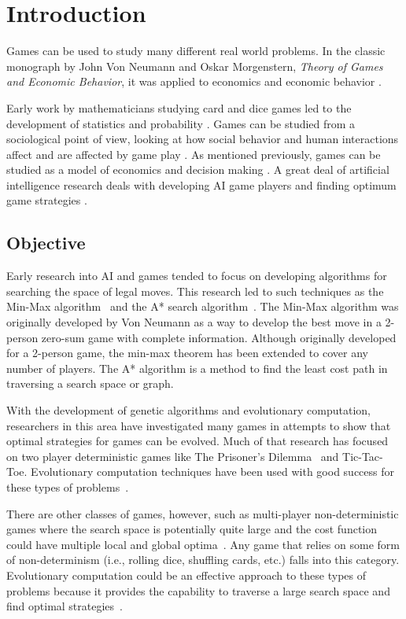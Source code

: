 \clearpage
\chapter{Introduction}\label{chap:intro}
Games can be used to study many different real world problems. In the
classic monograph by John Von Neumann and Oskar Morgenstern, \emph{Theory of
Games and Economic Behavior}, it was applied to economics and economic behavior
\cite{neumann1944theory}.

Early work by mathematicians studying card and dice games led to the development
of statistics and probability \cite{hald1990history,rudas2008handbook}. Games
can be studied from a sociological point of view, looking at how social behavior
and human interactions affect and are affected by game play
\cite{fararo1992meaning}. As mentioned previously, games can be studied as a
model of economics and decision making \cite{neumann1944theory}. A great deal of
artificial intelligence research deals with developing AI game players and
finding optimum game strategies \cite{russell2010artificial}.

\section{Objective}

Early research into AI and games tended to focus on developing algorithms for
searching the space of legal moves. This research led to such techniques as the
Min-Max algorithm~\cite{neumann1944theory} and the A* search
algorithm~\cite{Hart_Nilsson_Raphael_1968,Hart:1972:LFB:1056777.1056779}. The
Min-Max algorithm was originally developed by Von Neumann as a way to develop
the best move in a 2-person zero-sum game with complete information. Although
originally developed for a 2-person game, the min-max theorem has been extended
to cover any number of players. The A* algorithm is a method to find the least
cost path in traversing a search space or graph.

With the development of genetic algorithms and evolutionary computation,
re\-search\-ers in this area have investigated many games in attempts to show
that optimal strategies for games can be evolved. Much of that research has
focused on two player deterministic games like The Prisoner's
Dilemma~\cite{Flood1958} and Tic-Tac-Toe. Evolutionary computation techniques
have been used with good success for these types of
problems~\cite{DBLP:conf/cig/QuekG07,Fogel1993}.

There are other classes of games, however, such as multi-player
non-deterministic games where the search space is potentially quite large and
the cost function could have multiple local and global
optima~\cite{condon1992complexity,condon1993algorithms,Walker:gamebe:2011}. Any
game that relies on some form of non-determinism (i.e., rolling dice, shuffling
cards, etc.) falls into this category. Evolutionary computation could be an
effective approach to these types of problems because it provides the capability
to traverse a large search space and find optimal
strategies~\cite{Quek_GAPoker,Foster1990219,eriksson2001evolution}.

